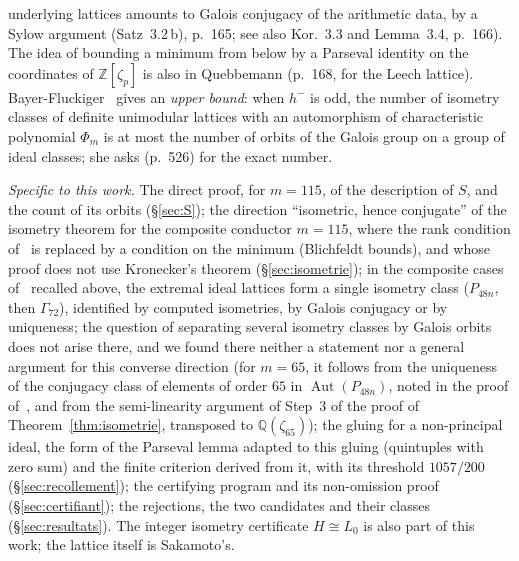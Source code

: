 \documentclass[11pt,a4paper]{amsart}
\theoremstyle{plain}
\theoremstyle{definition}
\numberwithin{equation}{section}
\newcommand{\Q}{\mathbb{Q}}
\newcommand{\Z}{\mathbb{Z}}
\DeclareMathOperator{\Aut}{Aut}
\newcommand{\Lz}{L_{0}}
\begin{document}
underlying lattices amounts to Galois conjugacy of the arithmetic data, by a Sylow argument (Satz~3.2\,b), p.~165; see also Kor.~3.3 and Lemma~3.4, p.~166). The idea of bounding a minimum from below by a Parseval identity on the coordinates of $\Z[\zeta_p]$ is also in Quebbemann (p.~168, for the Leech lattice). Bayer-Fluckiger~\cite[Cor.~3.3]{Bay84} gives an \emph{upper bound}: when $h^-$ is odd, the number of isometry classes of definite unimodular lattices with an automorphism of characteristic polynomial $\Phi_m$ is at most the number of orbits of the Galois group on a group of ideal classes; she asks (p.~526) for the exact number.

\emph{Specific to this work.} The direct proof, for $m=115$, of the description of $S$, and the count of its orbits (\S\ref{sec:S}); the direction ``isometric, hence conjugate'' of the isometry theorem for the composite conductor $m=115$, where the rank condition of~\cite{Que81} is replaced by a condition on the minimum (Blichfeldt bounds), and whose proof does not use Kronecker's theorem (\S\ref{sec:isometrie}); in the composite cases of~\cite{Neb13,Neb16} recalled above, the extremal ideal lattices form a single isometry class ($P_{48n}$, then $\Gamma_{72}$), identified by computed isometries, by Galois conjugacy or by uniqueness; the question of separating several isometry classes by Galois orbits does not arise there, and we found there neither a statement nor a general argument for this converse direction (for $m=65$, it follows from the uniqueness of the conjugacy class of elements of order $65$ in $\Aut(P_{48n})$, noted in the proof of~\cite[Thm.~5.3]{Neb13}, and from the semi-linearity argument of Step~3 of the proof of Theorem~\ref{thm:isometrie}, transposed to $\Q(\zeta_{65})$); the gluing for a non-principal ideal, the form of the Parseval lemma adapted to this gluing (quintuples with zero sum) and the finite criterion derived from it, with its threshold $1057/200$ (\S\ref{sec:recollement}); the certifying program and its non-omission proof (\S\ref{sec:certifiant}); the rejections, the two candidates and their classes (\S\ref{sec:resultats}). The integer isometry certificate $H\cong\Lz$ is also part of this work; the lattice itself is Sakamoto's.
\end{document}
